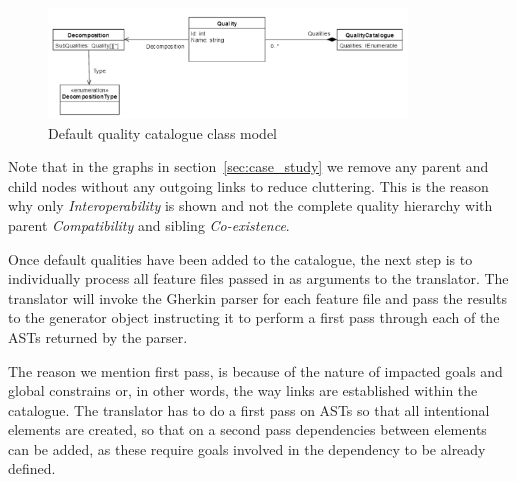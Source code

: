 \documentclass[dissertation,final]{softeng}
\begin{document}
\begin{figure}[h!]
\includegraphics[width=0.85\textwidth]{quality_catalogue}
\centering
\caption[Default quality catalogue class model]{Default quality catalogue class model}
\label{fig:quality_catalogue}
\end{figure}

Note that in the graphs in section~\ref{sec:case_study} we remove any parent and child nodes without any outgoing links to reduce cluttering. This is the reason why only \emph{Interoperability} is shown and not the complete quality hierarchy with parent \emph{Compatibility} and sibling \emph{Co-existence}.

Once default qualities have been added to the catalogue, the next step is to individually process all feature files passed in as arguments to the translator. The translator will invoke the Gherkin parser for each feature file and pass the results to the generator object instructing it to perform a first pass through each of the ASTs returned by the parser.

The reason we mention first pass, is because of the nature of impacted goals and global constrains or, in other words, the way links are established within the catalogue. The translator has to do a first pass on ASTs so that all intentional elements are created, so that on a second pass dependencies between elements can be added, as these require goals involved in the dependency to be already defined.
\end{document}

